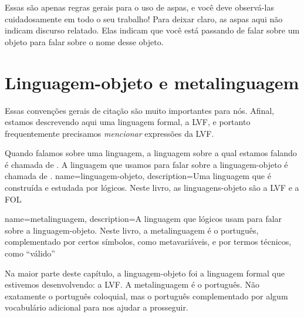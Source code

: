 Essas são apenas regras gerais para o uso de aspas, e você deve observá-las
cuidadosamente em todo o seu trabalho! Para deixar claro, as aspas aqui não
indicam discurso relatado. Elas indicam que você está passando de falar
sobre um objeto para falar sobre o nome desse objeto.


\section{Linguagem-objeto e metalinguagem}
Essas convenções gerais de citação são muito importantes para nós. Afinal,
estamos descrevendo aqui uma linguagem formal, a LVF, e portanto
frequentemente precisamos \emph{mencionar} expressões da LVF.

Quando falamos sobre uma linguagem, a linguagem sobre a qual estamos falando
é chamada de . A linguagem que usamos para falar
sobre a linguagem-objeto é chamada de .
\label{def.metalanguage}
{
name=linguagem-objeto,
description={Uma linguagem que é construída e estudada por lógicos. Neste livro,
 as linguagens-objeto são a LVF e a FOL}
}

{
name=metalinguagem,
description={A linguagem que lógicos usam para falar sobre a linguagem-objeto. Neste livro, a metalinguagem é o português, complementado por certos símbolos, como metavariáveis, e por termos técnicos, como ``válido''}
}

Na maior parte deste capítulo, a linguagem-objeto foi a linguagem formal
que estivemos desenvolvendo: a LVF. A metalinguagem é o português. Não
exatamente o português coloquial, mas o português complementado por algum
vocabulário adicional para nos ajudar a prosseguir.

